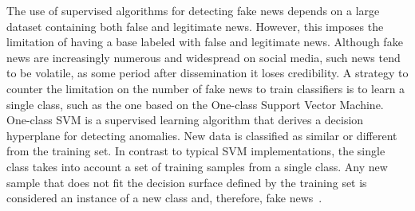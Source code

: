 \documentclass{ieeeaccess}
\begin{document}

The use of supervised algorithms for detecting fake news depends on a large dataset containing both false and legitimate news. However, this imposes the limitation of having a base labeled with false and legitimate news. Although fake news are increasingly numerous and widespread on social media, such news tend to be volatile, as some period after dissemination it loses credibility. A strategy to counter the limitation on the number of fake news to train classifiers is to learn a single class, such as the one based on the One-class Support Vector Machine. One-class SVM is a supervised learning algorithm that derives a decision hyperplane for detecting anomalies. New data is classified as similar or different from the training set. In contrast to typical SVM implementations, the single class takes into account a set of training samples from a single class. Any new sample that does not fit the decision surface defined by the training set is considered an instance of a new class and, therefore, fake news~\cite{perdisci2006using, detection2019gaonkar}.

\end{document}
